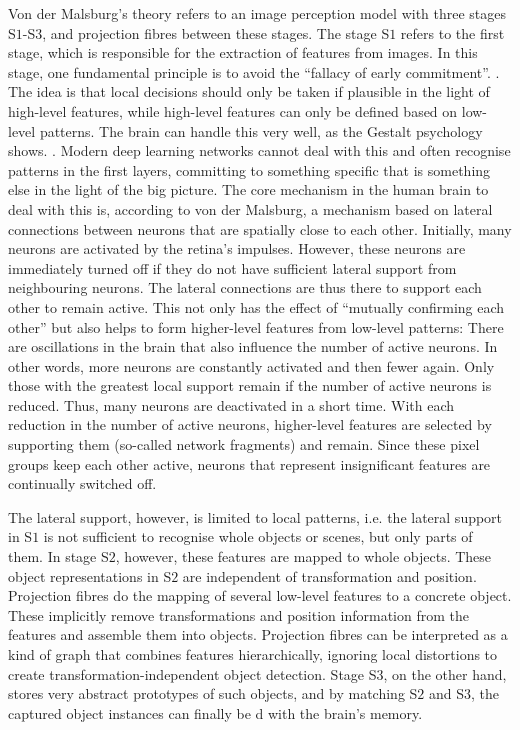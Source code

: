 Von der Malsburg's theory refers to an image perception model with three stages S$1$-S$3$, and projection fibres between these stages.
The stage S$1$ refers to the first stage, which is responsible for the extraction of features from images. In this stage, one fundamental principle is to avoid the ``fallacy of early commitment''. .
The idea is that local decisions should only be taken if plausible in the light of high-level features, while high-level features can only be defined based on low-level patterns.
The brain can handle this very well, as the Gestalt psychology shows. .
Modern deep learning networks cannot deal with this and often recognise patterns in the first layers, committing to something specific that is something else in the light of the big picture. The core mechanism in the human brain to deal with this is, according to von der Malsburg, a mechanism based on lateral connections between neurons that are spatially close to each other. Initially, many neurons are activated by the retina's impulses. However, these neurons are immediately turned off if they do not have sufficient lateral support from neighbouring neurons. The lateral connections are thus there to support each other to remain active. This not only has the effect of ``mutually confirming each other'' but also helps to form higher-level features from low-level patterns: There are oscillations in the brain that also influence the number of active neurons. In other words, more neurons are constantly activated and then fewer again. Only those with the greatest local support remain if the number of active neurons is reduced. Thus, many neurons are deactivated in a short time. With each reduction in the number of active neurons, higher-level features are selected by supporting them (so-called network fragments) and remain.
Since these pixel groups keep each other active, neurons that represent insignificant features are continually switched off.

The lateral support, however, is limited to local patterns, i.e. the lateral support in S$1$ is not sufficient to recognise whole objects or scenes, but only parts of them. In stage S$2$, however, these features are mapped to whole objects. These object representations in S$2$ are independent of transformation and position. Projection fibres do the mapping of several low-level features to a concrete object. These implicitly remove transformations and position information from the features and assemble them into objects. Projection fibres can be interpreted as a kind of graph that combines features hierarchically, ignoring local distortions to create transformation-independent object detection. Stage S$3$, on the other hand, stores very abstract prototypes of such objects, and by matching S$2$ and S$3$, the captured object instances can finally be d with the brain's memory.

